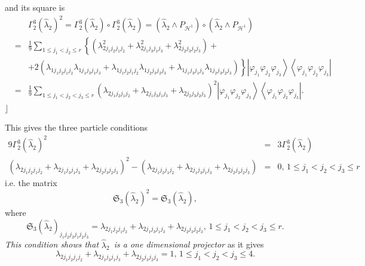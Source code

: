 \documentclass[12pt]{article}
\begin{document}
and its square is 
\begin{eqnarray*}
&&\Gamma _{2}^{3}\left( \hat{\lambda}_{2}\right) ^{2}=\Gamma _{2}^{3}\left( 
\hat{\lambda}_{2}\right) \circ \Gamma _{2}^{3}\left( \hat{\lambda}%
_{2}\right) =\left( \hat{\lambda}_{2}\wedge P_{\mathcal{H}^{1}}\right) \circ
\left( \hat{\lambda}_{2}\wedge P_{\mathcal{H}^{1}}\right) \\
&=&\frac{1}{9}\sum_{1\leq j_{1}<j_{2}\leq r}\left\{ \left( \lambda
_{2j_{1}j_{2}j_{1}j_{2}}^{2}+\lambda _{2j_{1}j_{3}j_{1}j_{3}}^{2}+\lambda
_{2j_{2}j_{3}j_{2}j_{3}}^{2}\right) \right. + \\
&&+\left. 2\left( \lambda _{1j_{1}j_{2}j_{1}j_{2}}\lambda
_{1j_{1}j_{3}j_{1}j_{3}}+\lambda _{1j_{1}j_{2}j_{1}j_{2}}\lambda
_{1j_{2}j_{3}j_{2}j_{3}}+\lambda _{1j_{1}j_{3}j_{1}j_{3}}\lambda
_{1j_{2}j_{3}j_{2}j_{3}}\right) \right\} \left\vert \varphi _{j_{1}}\varphi
_{j_{2}}\varphi _{j_{3}}\right\rangle \left\langle \varphi _{j_{1}}\varphi
_{j_{2}}\varphi _{j_{3}}\right\vert \\
&=&\frac{1}{9}\sum_{1\leq j_{1}<j_{2}<j_{3}\leq r}\left( \lambda
_{2j_{1}j_{2}j_{1}j_{2}}+\lambda _{2j_{1}j_{3}j_{1}j_{3}}+\lambda
_{2j_{2}j_{3}j_{2}j_{3}}\right) ^{2}\left\vert \varphi _{j_{1}}\varphi
_{j_{2}}\varphi _{j_{3}}\right\rangle \left\langle \varphi _{j_{1}}\varphi
_{j_{2}}\varphi _{j_{3}}\right\vert .
\end{eqnarray*}%
$\rfloor $

This gives the three particle conditions%
\begin{eqnarray*}
9\Gamma _{2}^{3}\left( \hat{\lambda}_{2}\right) ^{2} &=&3\Gamma
_{2}^{3}\left( \hat{\lambda}_{2}\right) \\
\left( \lambda _{2j_{1}j_{2}j_{1}j_{2}}+\lambda
_{2j_{1}j_{3}j_{1}j_{3}}+\lambda _{2j_{2}j_{3}j_{2}j_{3}}\right) ^{2}-\left(
\lambda _{2j_{1}j_{2}j_{1}j_{2}}+\lambda _{2j_{1}j_{3}j_{1}j_{3}}+\lambda
_{2j_{2}j_{3}j_{2}j_{3}}\right) &=&0,\,1\leq j_{1}<j_{2}<j_{3}\leq r
\end{eqnarray*}%
i.e. the matrix 
\begin{equation*}
\mathfrak{S}_{3}\left( \hat{\lambda}_{2}\right) ^{2}=\mathfrak{S}_{3}\left( 
\hat{\lambda}_{2}\right) ,
\end{equation*}%
where 
\begin{equation*}
\mathfrak{S}_{3}\left( \hat{\lambda}_{2}\right)
_{j_{1}j_{2}j_{3}j_{1}j_{2}j_{3}}=\lambda _{2j_{1}j_{2}j_{1}j_{2}}+\lambda
_{2j_{1}j_{3}j_{1}j_{3}}+\lambda _{2j_{2}j_{3}j_{2}j_{3}},\,1\leq
j_{1}<j_{2}<j_{3}\leq r.
\end{equation*}%
\emph{This condition shows that }$\hat{\lambda}_{2}$\emph{\ is a one
dimensional projector }as it gives\emph{\ }%
\begin{equation*}
\lambda _{2j_{1}j_{2}j_{1}j_{2}}+\lambda _{2j_{1}j_{3}j_{1}j_{3}}+\lambda
_{2j_{2}j_{3}j_{2}j_{3}}=1,\,1\leq j_{1}<j_{2}<j_{3}\leq 4.
\end{equation*}
\end{document}
